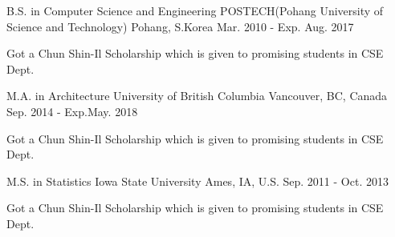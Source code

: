 

\begin{cventries}

    \cventry
    {B.S. in Computer Science and Engineering} %
    {POSTECH(Pohang University of Science and Technology)} %
    {Pohang, S.Korea} %
    {Mar. 2010 - Exp. Aug. 2017} %
    {
      \begin{cvitems} %
        \item {Got a Chun Shin-Il Scholarship which is given to promising students in CSE Dept.}
      \end{cvitems}
    }

    \cventry
      {M.A. in Architecture} %
      {University of British Columbia} %
      {Vancouver, BC, Canada} %
      {Sep. 2014 - Exp.May. 2018} %
      {
        \begin{cvitems} %
          \item {Got a Chun Shin-Il Scholarship which is given to promising students in CSE Dept.}
        \end{cvitems}
      }

    \cventry
      {M.S. in Statistics} %
      {Iowa State University} %
      {Ames, IA, U.S.} %
      {Sep. 2011 - Oct. 2013} %
      {
        \begin{cvitems} %
          \item {Got a Chun Shin-Il Scholarship which is given to promising students in CSE Dept.}
        \end{cvitems}
      }
\end{cventries}
